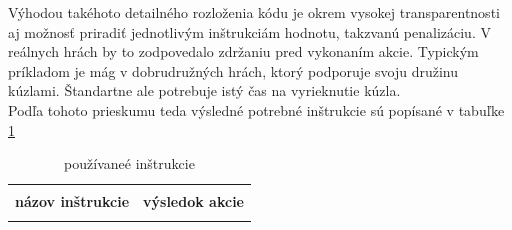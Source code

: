 Výhodou takéhoto detailného rozloženia kódu je okrem vysokej transparentnosti aj možnosť priradiť jednotlivým inštrukciám hodnotu, takzvanú penalizáciu. V reálnych hrách by to zodpovedalo zdržaniu pred vykonaním akcie. Typickým príkladom je mág v dobrudružných hrách, ktorý podporuje svoju družinu kúzlami. Štandartne ale potrebuje istý čas na vyrieknutie kúzla.\\
Podľa tohoto prieskumu teda výsledné potrebné inštrukcie sú popísané v tabuľke \ref{tab:instrukcie}
\begin{center}
\begin{longtable}{|l|l|}
\caption[používané inštrukcie]{používaneé inštrukcie}
\label{tab:instrukcie}\\
\hline \hline \\[-2ex]
\multicolumn{1}{c}{\textbf{názov inštrukcie}} &
\multicolumn{1}{c}{\textbf{výsledok akcie}} \\[0.5ex] \hline
\\[-1.8ex]
\endfirsthead


\end{longtable}
\end{center}
